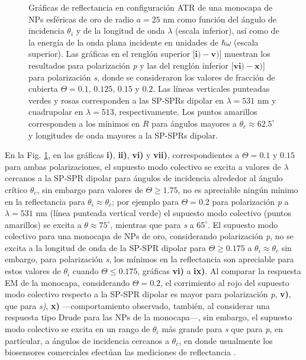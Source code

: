 \begin{figure}[t!]
\vspace*{-.5em}	
	\caption{Gráficas de reflectancia en configuración ATR  de una monocapa de NPs esféricas de oro de radio $a=25$ nm como función del ángulo de incidencia $\theta_i$ y de la longitud de onda $\lambda$ (escala inferior), así como de la energía de la onda plana incidente en unidades de $\hbar\omega$ (escala superior).  Las gráficas   en el renglón superior [$\mathbf{i)-v)}$] muestran los resultados para  polarización \emph{p} y las del renglón inferior  [$\mathbf{vi)-x)}$]  para polarización  \emph{s}, donde se consideraron los valores de fracción de cubierta $\Theta =  0.1,\,0.125,\,0.15$ y $0.2$.  Las líneas verticales punteadas verdes y rosas corresponden a las SP-SPRs dipolar en $\lambda=531$ nm y  cuadrupolar en $\lambda=513$, respectivamente.  Los puntos amarillos corresponden a los mínimos en $R$ para ángulos mayores a $\theta_c\approx 62.5^\circ$ y longitudes de onda mayores a la SP-SPRs dipolar.
}	\label{fig:Au-R-Theta}	
	\end{figure}	

En la Fig.  \ref{fig:Au-R-Theta}, en las gráficas \textbf{i)}, \textbf{ii)}, \textbf{vi)} y \textbf{vii)}, correspondientes a $\Theta=0.1$ y $0.15$ para ambas polarizaciones, el supuesto modo colectivo se excita a valores de $\lambda$ cercanos a la SP-SPR dipolar para ángulos de incidencia alrededor al ángulo crítico $\theta_c$, sin embargo para valores de $\Theta\geq 1.75$, no es apreciable ningún mínimo en la reflectancia para $\theta_i\approx\theta_c$; por ejemplo para $\Theta=0.2$ para polarización \emph{p} a $\lambda = 531$ nm (línea punteada vertical verde) el supuesto modo colectivo (puntos amarillos) se excita a $\theta\approx 75^\circ$, mientras que para \emph{s} a $65^\circ$. El supuesto modo colectivo para una monocapa de NPs de oro, considerando polarización \emph{p}, no se excita a la longitud de onda de la SP-SPR dipolar para $\Theta\geq 0.175$ a $\theta_i\approx\theta_c$ sin embargo, para polarización \emph{s}, los mínimos en la reflectancia son apreciable para estos valores de $\theta_i$ cuando $\Theta\leq 0.175$, gráficas \textbf{vi)} a \textbf{ix)}. Al comparar la respuesta EM de la monocapa, considerando $\Theta=0.2$, el corrimiento al rojo del supuesto modo colectivo respecto a la SP-SPR dipolar es mayor  para polarización \emph{p}, \textbf{v)}, que para \emph{s)}, \textbf{x)} ---comportamiento observado, también, al considerar una respuesta tipo Drude para las NPs de la monocapa---, sin embargo, el supuesto modo colectivo se excita en un rango de $\theta_i$ más grande para \emph{s} que para \emph{p}, en particular, a ángulos de incidencia cercanos a $\theta_c$, en donde usualmente los biosensores comerciales efectúan las mediciones de reflectancia \cite{svedendahl2009refractometric}.

